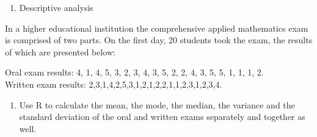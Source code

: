 \documentclass[]{article}
\providecommand{\tightlist}{%
  \setlength{\itemsep}{0pt}\setlength{\parskip}{0pt}}
\begin{document}
\begin{enumerate}
\def\labelenumi{\arabic{enumi}.}
\setcounter{enumi}{1}
\tightlist
\item
  Descriptive analysis
\end{enumerate}

In a higher educational institution the comprehensive applied
mathematics exam is comprised of two parts. On the first day, 20
students took the exam, the results of which are presented below:

Oral exam results: 4, 1, 4, 5, 3, 2, 3, 4, 3, 5, 2, 2, 4, 3, 5, 5, 1, 1,
1, 2.\\
Written exam results: 2,3,1,4,2,5,3,1,2,1,2,2,1,1,2,3,1,2,3,4.

\begin{enumerate}
\def\labelenumi{(\alph{enumi})}
\tightlist
\item
  Use R to calculate the mean, the mode, the median, the variance and
  the standard deviation of the oral and written exams separately and
  together as well.
\end{enumerate}
\end{document}
